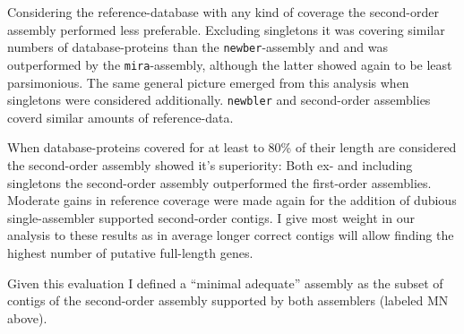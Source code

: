 


Considering the reference-database with any kind of coverage the
second-order assembly performed less preferable. Excluding singletons
it was covering similar numbers of database-proteins than the
\texttt{newber}-assembly and and was outperformed by the
\texttt{mira}-assembly, although the latter showed again to be least
parsimonious. The same general picture emerged from this analysis when
singletons were considered additionally. \texttt{newbler} and
second-order assemblies coverd similar amounts of reference-data.


When database-proteins covered for at least to 80\% of their length
are considered the second-order assembly showed it's superiority: Both
ex- and including singletons the second-order assembly outperformed
the first-order assemblies. Moderate gains in reference coverage were
made again for the addition of dubious single-assembler supported
second-order contigs. I give most weight in our analysis to these
results as in average longer correct contigs will allow finding the
highest number of putative full-length genes.

Given this evaluation I defined a ``minimal adequate'' assembly as
the subset of contigs of the second-order assembly supported by both
assemblers (labeled MN above).

